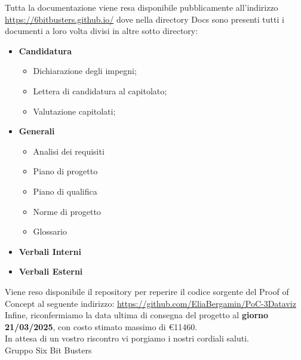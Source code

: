 \begin{titlepage}
        Tutta la documentazione viene resa disponibile pubblicamente all'indirizzo \url{https://6bitbusters.github.io/}
        dove nella directory Docs sono presenti tutti i documenti a loro volta divisi in altre sotto directory: 
        \begin{itemize}
                \item \textbf{Candidatura}
                \begin{itemize}
                        \item Dichiarazione degli impegni;
                        \item Lettera di candidatura al capitolato;
                        \item Valutazione capitolati;
                \end{itemize}
                \item \textbf{Generali}
                \begin{itemize}
                        \item Analisi dei requisiti
                        \item Piano di progetto
                        \item Piano di qualifica
                        \item Norme di progetto
                        \item Glossario
                \end{itemize}
                \item \textbf{Verbali Interni}
                \item \textbf{Verbali Esterni}
        \end{itemize}

        Viene reso disponibile il repository per reperire il codice sorgente del Proof of Concept al seguente indirizzo: 
        \url{https://github.com/EliaBergamin/PoC-3Dataviz}\\

        Infine, riconfermiamo la data ultima di consegna del progetto al \textbf{giorno 21/03/2025}, con costo
        stimato massimo di \euro{11460}.\\
	
	In attesa di un vostro riscontro vi porgiamo i nostri cordiali saluti.\\
        Gruppo Six Bit Busters
	
\end{titlepage}
